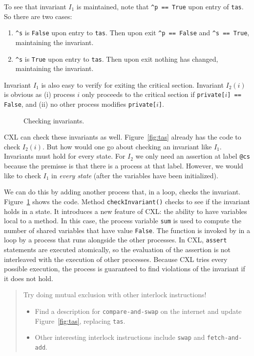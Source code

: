 \documentclass{report}
\newenvironment{code}{
\tcolorbox
}{
\endtcolorbox
}
\begin{document}
To see that invariant $I_1$ is maintained, note that
\texttt{\^{}p == True} upon entry of \texttt{tas}.
So there are two cases:
\begin{enumerate}
\item \texttt{\^{}s} is \texttt{False} upon entry to \texttt{tas}.
Then upon exit \texttt{\^{}p == False} and \texttt{\^{}s == True}, maintaining
the invariant.
\item \texttt{\^{}s} is \texttt{True} upon entry to \texttt{tas}.
Then upon exit nothing has changed, maintaining the invariant.
\end{enumerate}
Invariant $I_1$ is also easy to verify for exiting the critical section.
Invariant $I_2(i)$ is obvious as (i) process $i$ only proceeds to the critical
section if \texttt{private[$i$] == False}, and (ii) no other process modifies
\texttt{private[$i$]}.

\begin{figure}
\begin{code}
\end{code}
\caption{Checking invariants.}
\label{fig:tasinv}
\end{figure}

CXL can check these invariants as well.  Figure~\ref{fig:tas} already
has the code to check $I_2(i)$.  But how would one go about checking an
invariant like $I_1$.  Invariants must hold for every state.
For $I_2$ we only need an assertion at label \texttt{@cs} because the
premisse is that there is a process at that label.  However, we would
like to check $I_1$ in \emph{every state} (after the variables have
been initialized).

We can do this by adding another process that, in a loop,
checks the invariant.  Figure~\ref{fig:tasinv} shows the code.
Method \texttt{checkInvariant()} checks to see if the invariant holds
in a state.  It introduces a new feature of CXL: the ability to have
variables local to a method.  In this case, the process variable \texttt{sum}
is used to compute the number of shared variables that have value
\texttt{False}.
The function is invoked by in a loop by a process that runs alongside
the other processes.
In CXL, \texttt{assert} statements are executed atomically, so the
evaluation of the assertion is not interleaved with the execution
of other processes.
Because CXL tries every possible execution, the process is guaranteed
to find violations of the invariant if it does not hold.

\begin{quote}
Try doing mutual exclusion with other interlock instructions!
\begin{itemize}
\item Find a description for \texttt{compare-and-swap} on the internet and
update Figure~\ref{fig:tas}, replacing \texttt{tas}.
\item Other interesting interlock instructions include \texttt{swap} and
\texttt{fetch-and-add}.
\end{itemize}
\end{quote}
\end{document}

